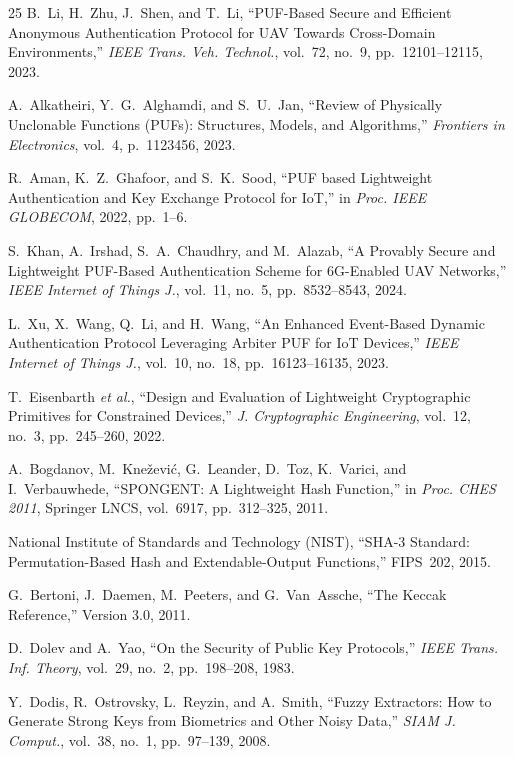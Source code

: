 \documentclass[11pt,a4paper]{article}
\begin{document}
\begin{thebibliography}{25}
B.~Li, H.~Zhu, J.~Shen, and T.~Li, ``PUF-Based Secure and Efficient Anonymous Authentication Protocol for UAV Towards Cross-Domain Environments,'' \textit{IEEE Trans. Veh. Technol.}, vol.~72, no.~9, pp.~12101--12115, 2023.

A.~Alkatheiri, Y.~G.~Alghamdi, and S.~U.~Jan, ``Review of Physically Unclonable Functions (PUFs): Structures, Models, and Algorithms,'' \textit{Frontiers in Electronics}, vol.~4, p.~1123456, 2023.

R.~Aman, K.~Z.~Ghafoor, and S.~K.~Sood, ``PUF based Lightweight Authentication and Key Exchange Protocol for IoT,'' in \textit{Proc. IEEE GLOBECOM}, 2022, pp.~1--6.

S.~Khan, A.~Irshad, S.~A.~Chaudhry, and M.~Alazab, ``A Provably Secure and Lightweight PUF-Based Authentication Scheme for 6G-Enabled UAV Networks,'' \textit{IEEE Internet of Things J.}, vol.~11, no.~5, pp.~8532--8543, 2024.

L.~Xu, X.~Wang, Q.~Li, and H.~Wang, ``An Enhanced Event-Based Dynamic Authentication Protocol Leveraging Arbiter PUF for IoT Devices,'' \textit{IEEE Internet of Things J.}, vol.~10, no.~18, pp.~16123--16135, 2023.

T.~Eisenbarth \textit{et al.}, ``Design and Evaluation of Lightweight Cryptographic Primitives for Constrained Devices,'' \textit{J. Cryptographic Engineering}, vol.~12, no.~3, pp.~245--260, 2022.

A.~Bogdanov, M.~Kne\v{z}evi\'c, G.~Leander, D.~Toz, K.~Varici, and I.~Verbauwhede, ``SPONGENT: A Lightweight Hash Function,'' in \textit{Proc. CHES 2011}, Springer LNCS, vol.~6917, pp.~312--325, 2011.

National Institute of Standards and Technology (NIST), ``SHA-3 Standard: Permutation-Based Hash and Extendable-Output Functions,'' FIPS~202, 2015.

G.~Bertoni, J.~Daemen, M.~Peeters, and G.~Van~Assche, ``The Keccak Reference,'' Version 3.0, 2011.

D.~Dolev and A.~Yao, ``On the Security of Public Key Protocols,'' \textit{IEEE Trans. Inf. Theory}, vol.~29, no.~2, pp.~198--208, 1983.

Y.~Dodis, R.~Ostrovsky, L.~Reyzin, and A.~Smith, ``Fuzzy Extractors: How to Generate Strong Keys from Biometrics and Other Noisy Data,'' \textit{SIAM J. Comput.}, vol.~38, no.~1, pp.~97--139, 2008.


\end{thebibliography}
\end{document}
